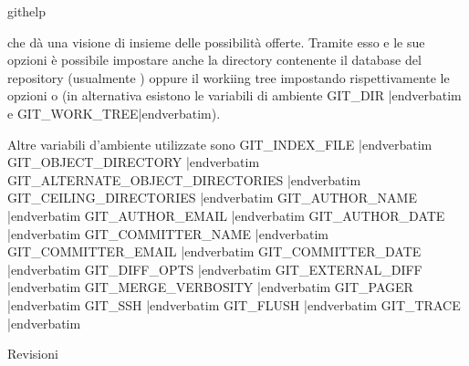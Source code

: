  githelp

che d\`a una visione di insieme
delle possibilit\`a offerte. Tramite esso e le
sue opzioni \`e possibile impostare anche la directory contenente il database
del repository (usualmente ) oppure il workiing tree impostando
rispettivamente le opzioni  o  (in
alternativa esistono le variabili di ambiente \verbatim GIT_DIR |endverbatim e
\verbatim GIT_WORK_TREE|endverbatim).

Altre variabili d'ambiente utilizzate sono
\unorderedlist
\li\verbatim GIT_INDEX_FILE |endverbatim
\li\verbatim GIT_OBJECT_DIRECTORY |endverbatim
\li\verbatim GIT_ALTERNATE_OBJECT_DIRECTORIES |endverbatim
\li\verbatim GIT_CEILING_DIRECTORIES |endverbatim
\li\verbatim GIT_AUTHOR_NAME |endverbatim
\li\verbatim GIT_AUTHOR_EMAIL |endverbatim
\li\verbatim GIT_AUTHOR_DATE |endverbatim
\li\verbatim GIT_COMMITTER_NAME |endverbatim
\li\verbatim GIT_COMMITTER_EMAIL |endverbatim
\li\verbatim GIT_COMMITTER_DATE |endverbatim
\li\verbatim GIT_DIFF_OPTS |endverbatim
\li\verbatim GIT_EXTERNAL_DIFF |endverbatim
\li\verbatim GIT_MERGE_VERBOSITY |endverbatim
\li\verbatim GIT_PAGER |endverbatim
\li\verbatim GIT_SSH |endverbatim
\li\verbatim GIT_FLUSH |endverbatim
\li\verbatim GIT_TRACE |endverbatim
\endunorderedlist

\sezione Revisioni


